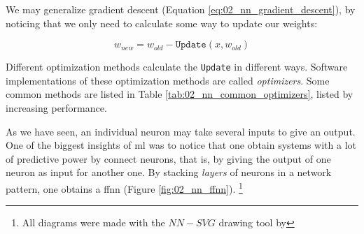 
\label{02_nn_optimizers}

We may generalize gradient descent (Equation \ref{eq:02_nn_gradient_descent}), by noticing that we only need to calculate some way to update our weights:

\begin{equation}
    w_{new} = w_{old} - \texttt{Update}(x, w_{old})
\end{equation}

Different optimization methods calculate the \texttt{Update} in different ways. Software implementations of these optimization methods are called \emph{optimizers}. Some common methods are listed in Table \ref{tab:02_nn_common_optimizers}, listed by increasing performance.

\begin{table}%
    \centering
    \caption{Common optimization methods for backpropagation}
    \label{tab:02_nn_common_optimizers}
\end{table}


\label{02_nn_ffnn}

As we have seen, an individual neuron may take several inputs to give an output. 
One of the biggest insights of \gls{ml} was to notice that one obtain systems with a lot of predictive power by connect neurons, that is, by giving the output of one neuron as input for another one. By stacking \emph{layers} of neurons in a network pattern, one obtains a \gls{ffnn} (Figure \ref{fig:02_nn_ffnn}). 
\footnote{All \neuralNetwork{} diagrams were made with the $NN-SVG$ drawing tool by }

